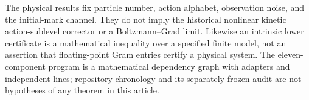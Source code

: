 The physical results fix particle number, action alphabet, observation
noise, and the initial-mark channel. They do not imply the historical
nonlinear kinetic action-sublevel corrector or a Boltzmann--Grad limit.
Likewise an intrinsic lower certificate is a mathematical inequality over
a specified finite model, not an assertion that floating-point Gram
entries certify a physical system. The eleven-component program is a
mathematical dependency graph with adapters and independent lines;
repository chronology and its separately frozen audit are not hypotheses
of any theorem in this article.
